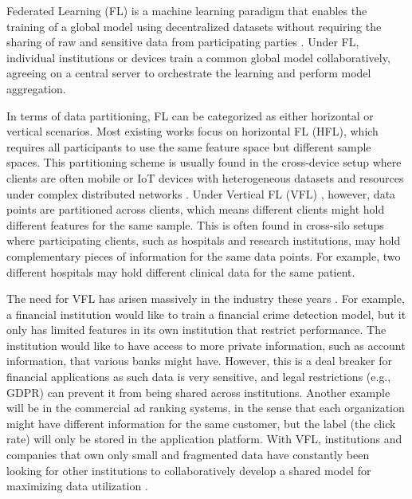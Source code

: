 \documentclass[withindex,glossary]{cam-thesis}
\begin{document}
Federated Learning (FL) is a machine learning paradigm that enables the training of a global model using decentralized datasets without requiring the sharing of raw and sensitive data from participating parties \citep{fedavg, fedprox, yang2019federated}. Under FL, individual institutions or devices train a common global model collaboratively, agreeing on a central server to orchestrate the learning and perform model aggregation. 

In terms of data partitioning, FL can be categorized as either horizontal or vertical scenarios. Most existing works focus on horizontal FL (HFL), which requires all participants to use the same feature space but different sample spaces\citep{yang2019federated}. This partitioning scheme is usually found in the cross-device setup where clients are often mobile or IoT devices with heterogeneous datasets and resources under complex distributed networks \citep{yu2021toward, qiu2021zerofl}. Under Vertical FL (VFL) \citep{wei2022vertical}, however, data points are partitioned across clients, which means different clients might hold different features for the same sample. This is often found in cross-silo setups where participating clients, such as hospitals and research institutions, may hold complementary pieces of information for the same data points. For example, two different hospitals may hold different clinical data for the same patient.


The need for VFL has arisen massively in the industry these years \citep{vfl, liu2020asymmetrical}. For example, a financial institution would like to train a financial crime detection model, but it only has limited features in its own institution that restrict performance. The institution would like to have access to more private information, such as account information, that various banks might have. However, this is a deal breaker for financial applications as such data is very sensitive, and legal restrictions (e.g., GDPR) can prevent it from being shared across institutions. Another example will be in the commercial ad ranking systems, in the sense that each organization might have different information for the same customer, but the label (the click rate) will only be stored in the application platform. With VFL, institutions and companies that own only small and fragmented data have constantly been looking for other institutions to collaboratively develop a shared model for maximizing data utilization \citep{li2021survey}. 
\end{document}
